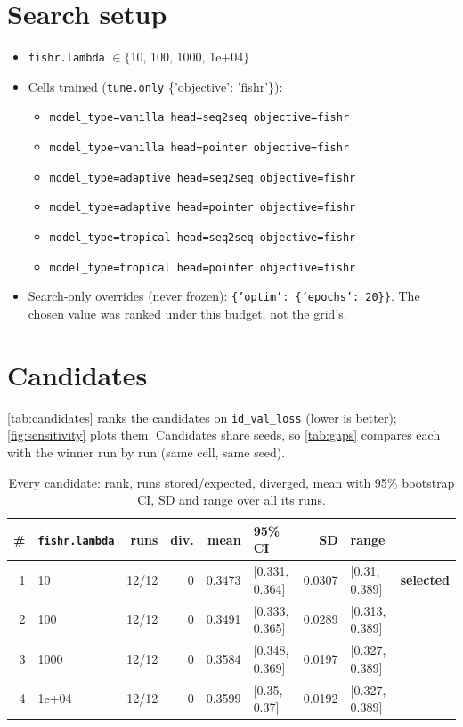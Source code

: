 \documentclass[10pt]{article}
\begin{document}
\section{Search setup}
\begin{itemize}\setlength\itemsep{0pt}
\item \texttt{fishr.lambda} $\in \{$10, 100, 1000, 1e+04$\}$
\item Cells trained (\texttt{tune.only} \{'objective': 'fishr'\}):
\begin{itemize}\setlength\itemsep{0pt}
\item \texttt{model\_type=vanilla head=seq2seq objective=fishr}
\item \texttt{model\_type=vanilla head=pointer objective=fishr}
\item \texttt{model\_type=adaptive head=seq2seq objective=fishr}
\item \texttt{model\_type=adaptive head=pointer objective=fishr}
\item \texttt{model\_type=tropical head=seq2seq objective=fishr}
\item \texttt{model\_type=tropical head=pointer objective=fishr}
\end{itemize}
\item Search-only overrides (never frozen): \texttt{\{'optim': \{'epochs': 20\}\}}. The chosen value was ranked under this budget, not the grid's.
\end{itemize}

\section{Candidates}
\autoref{tab:candidates} ranks the candidates on \texttt{id\_val\_loss} (lower is better); \autoref{fig:sensitivity} plots them.
Candidates share seeds, so \autoref{tab:gaps} compares each with the winner run by run (same cell, same seed).

{\small
\begin{longtable}{rlrrrlrll}
\caption{Every candidate: rank, runs stored/expected, diverged, mean with 95\% bootstrap CI, SD and range over all its runs.}\label{tab:candidates}\\
\toprule
\# & \texttt{fishr.lambda} & runs & div. & mean & 95\% CI & SD & range & \\
\midrule
\endhead
1 & 10 & 12/12 & 0 & 0.3473 & [0.331, 0.364] & 0.0307 & [0.31, 0.389] & \textbf{selected}\\
2 & 100 & 12/12 & 0 & 0.3491 & [0.333, 0.365] & 0.0289 & [0.313, 0.389] & \\
3 & 1000 & 12/12 & 0 & 0.3584 & [0.348, 0.369] & 0.0197 & [0.327, 0.389] & \\
4 & 1e+04 & 12/12 & 0 & 0.3599 & [0.35, 0.37] & 0.0192 & [0.327, 0.389] & \\
\bottomrule
\end{longtable}
}
\end{document}
